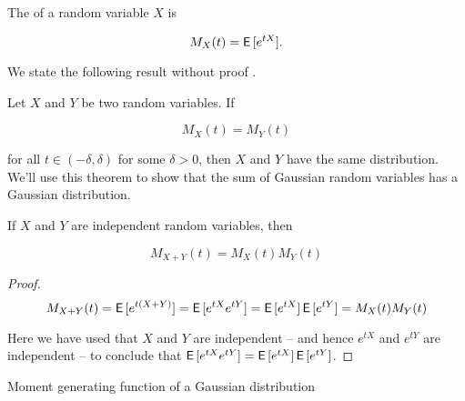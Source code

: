 
\begin{defn}
The  of a random variable $X$ is

\begin{equation}
M_X(t) = \operatorname{\textsf{E}\,}[e^{t X}].
\end{equation}
\end{defn}

We state the following result without proof .

\begin{thm}
Let $X$ and $Y$ be two random variables. If

\begin{equation}
M_X(t) = M_Y(t)
\end{equation}

for all $t \in (-\delta, \delta)$ for some $\delta > 0$, then $X$ and $Y$ have the same distribution. We'll use this theorem to show that the sum of Gaussian random variables has a Gaussian distribution.
\end{thm}

\begin{thm} \citep{mitzenmacher2017probability}\label{thm:sum-independent-gaussian}
If $X$ and $Y$ are independent random variables, then

\begin{equation}
M_{X + Y}(t) = M_X(t) M_Y(t)
\end{equation}
\end{thm}
\begin{proof}
\begin{equation}
M_{X + Y}(t) = \operatorname{\textsf{E}\,}[e^{t(X + Y)}] = \operatorname{\textsf{E}\,}[e^{tX} e^{tY}] = \operatorname{\textsf{E}\,}[e^{tX}] \operatorname{\textsf{E}\,}[e^{tY}] = M_X(t) M_Y(t)
\end{equation}

Here we have used that $X$ and $Y$ are independent -- and hence $e^{tX}$ and $e^{tY}$ are independent -- to conclude that $\operatorname{\textsf{E}\,}[e^{tX} e^{tY}] = \operatorname{\textsf{E}\,}[e^{tX}] \operatorname{\textsf{E}\,}[e^{tY}]$. 
\end{proof}

\begin{thm} Moment generating function of a Gaussian distribution

\end{thm}

